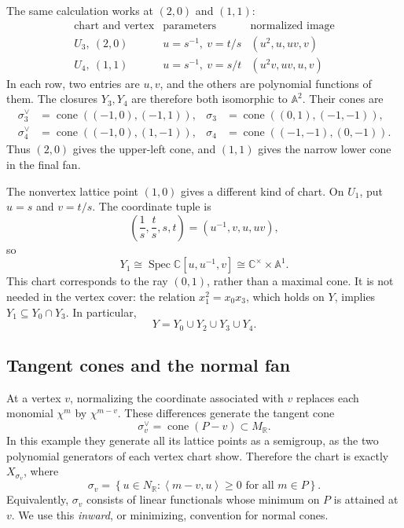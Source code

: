 \documentclass[11pt]{article}
\theoremstyle{definition}
\theoremstyle{remark}
\DeclareMathOperator{\Spec}{Spec}
\newcommand{\set}[1]{\left\{#1\right\}}
\newcommand{\braket}[2]{\left\langle #1,#2\right\rangle}
\newcommand{\bA}{\mathbb{A}}
\newcommand{\bR}{\mathbb{R}}
\begin{document}
The same calculation works at \((2,0)\) and \((1,1)\):
\[
\begin{array}{c|c|c}
    \text{chart and vertex} & \text{parameters} & \text{normalized image}\\ \hline
    U_3,\ (2,0) & u=s^{-1},\ v=t/s & (u^2,u,uv,v)\\[2pt]
    U_4,\ (1,1) & u=s^{-1},\ v=s/t & (u^2v,uv,u,v)
\end{array}
\]
In each row, two entries are \(u,v\), and the others are polynomial
functions of them. The closures \(Y_3,Y_4\) are therefore both
isomorphic to \(\bA^2\). Their cones are
\[
\begin{aligned}
    \sigma_3^\vee&=\operatorname{cone}((-1,0),(-1,1)),
    &\sigma_3&=\operatorname{cone}((0,1),(-1,-1)),\\
    \sigma_4^\vee&=\operatorname{cone}((-1,0),(1,-1)),
    &\sigma_4&=\operatorname{cone}((-1,-1),(0,-1)).
\end{aligned}
\]
Thus \((2,0)\) gives the upper-left cone, and \((1,1)\) gives the
narrow lower cone in the final fan.

The nonvertex lattice point \((1,0)\) gives a different kind of chart.
On \(U_1\), put \(u=s\) and \(v=t/s\). The coordinate tuple is
\[
    \left(\frac1s,\frac ts,s,t\right)=(u^{-1},v,u,uv),
\]
so
\[
    Y_1\cong\Spec\mathbb C[u,u^{-1},v]
        \cong\mathbb C^\times\times\bA^1.
\]
This chart corresponds to the ray \((0,1)\), rather than a maximal
cone. It is not needed in the vertex cover: the relation
\(x_1^2=x_0x_3\), which holds on \(Y\), implies
\(Y_1\subseteq Y_0\cap Y_3\). In particular,
\[
    Y=Y_0\cup Y_2\cup Y_3\cup Y_4.
\]

\subsection{Tangent cones and the normal fan}

At a vertex \(v\), normalizing the coordinate associated with \(v\)
replaces each monomial \(\chi^m\) by \(\chi^{m-v}\). These differences
generate the tangent cone
\[
    \sigma_v^\vee=\operatorname{cone}(P-v)\subset M_\bR.
\]
In this example they generate all its lattice points as a semigroup,
as the two polynomial generators of each vertex chart show. Therefore
the chart is exactly \(X_{\sigma_v}\), where
\[
    \sigma_v=
    \set{u\in N_\bR:\braket{m-v}{u}\geq0\text{ for all }m\in P}.
\]
Equivalently, \(\sigma_v\) consists of linear functionals whose
minimum on \(P\) is attained at \(v\). We use this \emph{inward},
or minimizing, convention for normal cones.
\end{document}
